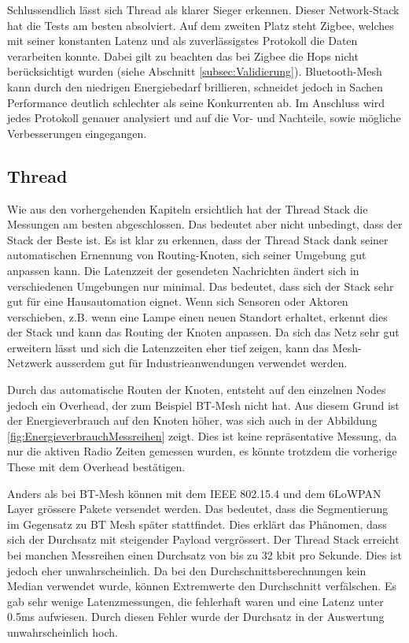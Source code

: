 Schlussendlich lässt sich Thread als klarer Sieger erkennen. Dieser Network-Stack hat die Tests am besten absolviert. Auf dem zweiten Platz steht Zigbee, welches mit seiner konstanten Latenz und als zuverlässigstes Protokoll die Daten verarbeiten konnte. Dabei gilt zu beachten das bei Zigbee die Hops nicht berücksichtigt wurden (siehe Abschnitt \ref{subsec:Validierung}). Bluetooth-Mesh kann durch den niedrigen Energiebedarf brillieren, schneidet jedoch in Sachen Performance deutlich schlechter als seine Konkurrenten ab. Im Anschluss wird jedes Protokoll genauer analysiert und auf die Vor- und Nachteile, sowie mögliche Verbesserungen eingegangen. 


\subsection{Thread}\label{subsec:Thread}
Wie aus den vorhergehenden Kapiteln ersichtlich hat der Thread Stack die Messungen am besten abgeschlossen. Das bedeutet aber nicht unbedingt, dass der Stack der Beste ist. Es ist klar zu erkennen, dass der Thread Stack dank seiner automatischen Ernennung von Routing-Knoten, sich seiner Umgebung gut anpassen kann. Die Latenzzeit der gesendeten Nachrichten ändert sich in verschiedenen Umgebungen nur minimal. Das bedeutet, dass sich der Stack sehr gut für eine Hausautomation eignet. Wenn sich Sensoren oder Aktoren verschieben, z.B. wenn eine Lampe einen neuen Standort erhaltet, erkennt dies der Stack und kann das Routing der Knoten anpassen. Da sich das Netz sehr gut erweitern lässt und sich die Latenzzeiten eher tief zeigen, kann das Mesh-Netzwerk ausserdem gut für Industrieanwendungen verwendet werden. 

Durch das automatische Routen der Knoten, entsteht auf den einzelnen Nodes jedoch ein Overhead, der zum Beispiel BT-Mesh nicht hat. Aus diesem Grund ist der Energieverbrauch auf den Knoten höher, was sich auch in der Abbildung \ref{fig:EnergieverbrauchMessreihen} zeigt. Dies ist keine repräsentative Messung, da nur die aktiven Radio Zeiten gemessen wurden, es könnte trotzdem die vorherige These mit dem Overhead bestätigen. 

Anders als bei BT-Mesh können mit dem IEEE 802.15.4 und dem 6LoWPAN Layer grössere Pakete versendet werden. Das bedeutet, dass die Segmentierung im Gegensatz zu BT Mesh später stattfindet. Dies erklärt das Phänomen, dass sich der Durchsatz mit steigender Payload vergrössert. Der Thread Stack erreicht bei manchen Messreihen einen Durchsatz von bis zu 32 kbit pro Sekunde. Dies ist jedoch eher unwahrscheinlich. Da bei den Durchschnittsberechnungen kein Median verwendet wurde, können Extremwerte den Durchschnitt verfälschen. Es gab sehr wenige Latenzmessungen, die fehlerhaft waren und eine Latenz unter 0.5ms aufwiesen. Durch diesen Fehler wurde der Durchsatz in der Auswertung unwahrscheinlich hoch. 

